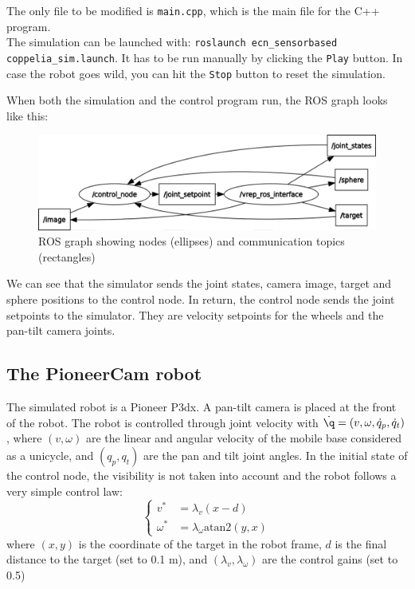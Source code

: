 \documentclass{ecnreport}
\begin{document}
The only file to be modified is \texttt{main.cpp}, which is the main file for the C++ program. \\
The simulation can be launched with: \texttt{roslaunch ecn\_sensorbased coppelia\_sim.launch}. It has to be run manually by clicking the \texttt{Play} button. 
In case the robot goes wild, you can hit the \texttt{Stop} button to reset the simulation.

When both the simulation and the control program run, the ROS graph looks like this:

\begin{figure}[h!]\centering
 \includegraphics[width=.6\linewidth]{rosgraph}
 \caption{ROS graph showing nodes (ellipses) and communication topics (rectangles)}
 \label{fig:rosgraph}
\end{figure}

We can see that the simulator sends the joint states, camera image, target and sphere positions to the control node. In return, the control node sends the joint setpoints
to the simulator. They are velocity setpoints for the wheels and the pan-tilt camera joints.\\


\subsection{The PioneerCam robot}

The simulated robot is a Pioneer P3dx. A pan-tilt camera is placed at the front of the robot. The robot is controlled through joint velocity with $\dot \q = (v, \omega, \dot q_p, \dot q_t)$, where $(v,\omega)$ are the linear and angular velocity
of the mobile base considered as a unicycle, and $(q_p, q_t)$ are the pan and tilt joint angles. In the initial state of the control node, the visibility is not taken into account and the robot follows a very simple control law:
\begin{equation}\label{raw}
 \left\{\begin{array}{ll}
         v^* &= \lambda_v(x-d) \\ \omega^* &= \lambda_{\omega}\text{atan2}(y, x)
        \end{array}\right.
\end{equation}where $(x,y)$ is the coordinate of the target in the robot frame, $d$ is the final distance to the target (set to 0.1 m), and $(\lambda_v, \lambda_{\omega})$ are the control gains (set to 0.5)\\
\end{document}
